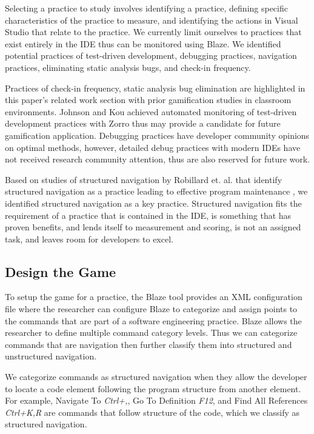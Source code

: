 \documentclass{sig-alternate}
\begin{document}
Selecting a practice to study involves identifying a practice, defining specific characteristics of the practice to measure, and identifying the actions in Visual Studio that relate to the practice.  We currently limit ourselves to practices that exist entirely in the IDE thus can be monitored using Blaze.  We identified potential practices of test-driven development, debugging practices, navigation practices,  eliminating static analysis bugs, and check-in frequency.  

Practices of check-in frequency, static analysis bug elimination are highlighted in this paper's related work section with prior gamification studies in classroom environments.  Johnson and Kou achieved automated monitoring of test-driven development practices with Zorro thus may provide a candidate for future gamification application.   Debugging practices have developer community opinions on optimal methods, however, detailed debug practices with modern IDEs have not received research community attention, thus are also reserved for future work.  

Based on studies of structured navigation by Robillard et. al. that identify structured navigation as a practice leading to effective program maintenance  \cite{wbsnipes:Robillard2004How}, we identified structured navigation as a key practice.   Structured navigation fits the requirement of a practice that is contained in the IDE, is something that has proven benefits, and lends itself to measurement and scoring, is not an assigned task, and leaves room for developers to excel.  

\subsection{Design the Game}

To setup the game for a practice, the Blaze tool provides an XML configuration file where the researcher can configure Blaze to categorize and assign points to the commands that are part of a software engineering practice.  Blaze allows the researcher to define multiple command category levels.  Thus we can categorize commands that are navigation then further classify them into structured and unstructured navigation.  

We categorize commands as structured navigation when they allow the developer to locate a code element following the program structure from another element.  For example, Navigate To \textit{Ctrl+,}, Go To Definition \textit{F12}, and Find All References \textit{Ctrl+K,R} are commands that follow structure of the code, which we classify as structured navigation.
\end{document}
